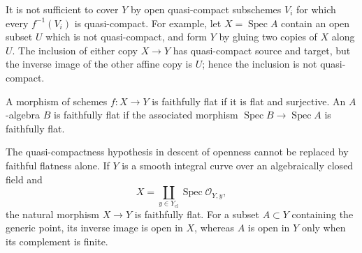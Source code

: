 \begin{remark}\label{fga-rem-1-5}
It is not sufficient to cover $Y$ by open quasi-compact subschemes $V_i$ for
which every $f^{-1}(V_i)$ is quasi-compact.  For example, let
$X=\operatorname{Spec}A$ contain an open subset $U$ which is not quasi-compact,
and form $Y$ by gluing two copies of $X$ along $U$.  The inclusion of either
copy $X\to Y$ has quasi-compact source and target, but the inverse image of the
other affine copy is $U$; hence the inclusion is not quasi-compact.
\end{remark}

\begin{definition}\label{fga-def-1-10}
A morphism of schemes $f:X\to Y$ is faithfully flat if it is flat and
surjective.  An $A$-algebra $B$ is faithfully flat if the associated morphism
$\operatorname{Spec}B\to\operatorname{Spec}A$ is faithfully flat.
\end{definition}

\begin{remark}\label{fga-rem-1-14}
The quasi-compactness hypothesis in descent of openness cannot be replaced by
faithful flatness alone.  If $Y$ is a smooth integral curve over an
algebraically closed field and
\[
X=\coprod_{y\in Y_{\mathrm{cl}}}\operatorname{Spec}\mathcal O_{Y,y},
\]
the natural morphism $X\to Y$ is faithfully flat.  For a subset $A\subset Y$
containing the generic point, its inverse image is open in $X$, whereas $A$ is
open in $Y$ only when its complement is finite.
\end{remark}
